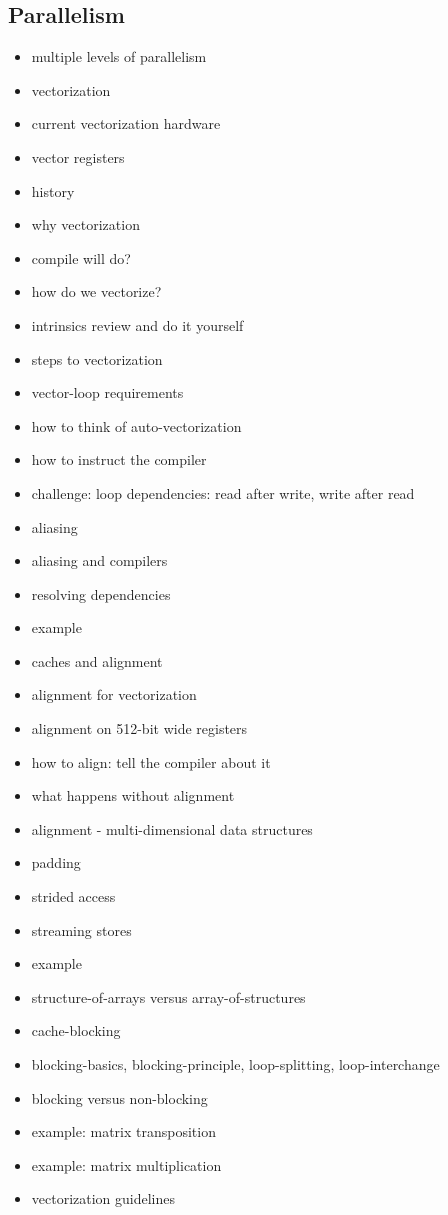 \documentclass[8pt,a4paper,fleqn]{article}
\begin{document}
\begin{multicols}{2}
  \section{Parallelism} %
  \label{sec:parallelism}
  \begin{itemize}
    \item multiple levels of parallelism
    \item vectorization
    \item current vectorization hardware
    \item vector registers
    \item history
    \item why vectorization
    \item compile will do?
    \item how do we vectorize?
    \item intrinsics review and do it yourself
    \item steps to vectorization
    \item vector-loop requirements
    \item how to think of auto-vectorization
    \item how to instruct the compiler
    \item challenge: loop dependencies: read after write, write after read
    \item aliasing
    \item aliasing and compilers
    \item resolving dependencies
    \item example
    \item caches and alignment
    \item alignment for vectorization
    \item alignment on 512-bit wide registers
    \item how to align: tell the compiler about it
    \item what happens without alignment
    \item alignment - multi-dimensional data structures
    \item padding
    \item strided access
    \item streaming stores
    \item example
    \item structure-of-arrays versus array-of-structures
    \item cache-blocking
    \item blocking-basics, blocking-principle, loop-splitting, loop-interchange
    \item blocking versus non-blocking
    \item example: matrix transposition
    \item example: matrix multiplication
    \item vectorization guidelines
  \end{itemize}


\end{multicols}
\end{document}
